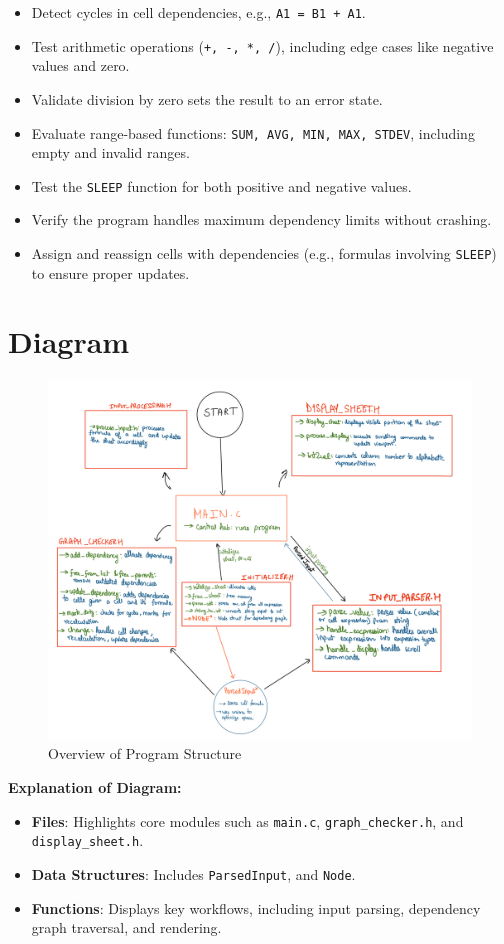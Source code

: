 \documentclass[12pt]{article}
\begin{document}
\begin{itemize}
    \item Detect cycles in cell dependencies, e.g., \texttt{A1 = B1 + A1}.
    \item Test arithmetic operations (\texttt{+, -, *, /}), including edge cases like negative values and zero.
    \item Validate division by zero sets the result to an error state.
    \item Evaluate range-based functions: \texttt{SUM, AVG, MIN, MAX, STDEV}, including empty and invalid ranges.
    \item Test the \texttt{SLEEP} function for both positive and negative values.
    \item Verify the program handles maximum dependency limits without crashing.
    \item Assign and reassign cells with dependencies (e.g., formulas involving \texttt{SLEEP}) to ensure proper updates.
\end{itemize}


\newpage

\section*{Diagram}
\begin{figure}[h!]
    \centering
    \includegraphics[width=\textwidth]{diagram.png}
    \caption{Overview of Program Structure}
\end{figure}

\textbf{Explanation of Diagram:}
\begin{itemize}
    \item \textbf{Files}: Highlights core modules such as \texttt{main.c}, \texttt{graph\_checker.h}, and \texttt{display\_sheet.h}.
    \item \textbf{Data Structures}: Includes \texttt{ParsedInput}, and \texttt{Node}.
    \item \textbf{Functions}: Displays key workflows, including input parsing, dependency graph traversal, and rendering.
\end{itemize}
\end{document}

